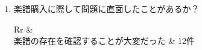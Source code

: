 \begin{oframed}
\begin{enumerate}
        \item 楽譜購入に際して問題に直面したことがあるか？\vspace{.3cm}\\
              \begin{tabularx}{\linewidth}{Rr}
                   &  \\
                  \hline
                  楽譜の存在を確認することが{{大変}}だった              & 12件                                \\
                  \hline
              \end{tabularx}
    \end{enumerate}
\end{oframed}